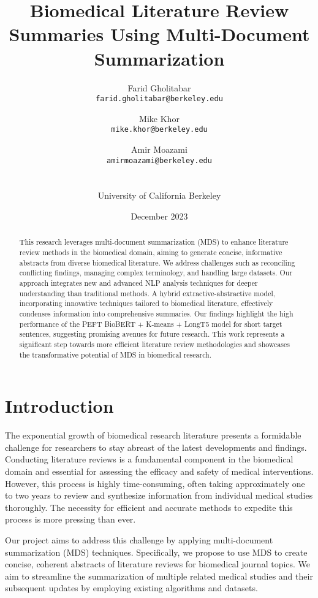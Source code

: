 \documentclass[11pt]{article}
\title{Biomedical Literature Review Summaries Using Multi-Document Summarization}
\author{
  \begin{tabular}{c}
    Farid Gholitabar \\
    {\small\texttt{farid.gholitabar@berkeley.edu}}
  \end{tabular}\and
  \begin{tabular}{c}
    Mike Khor \\
    {\small\texttt{mike.khor@berkeley.edu}}
  \end{tabular}\and
  \begin{tabular}{c}
    Amir Moazami \\
    {\small\texttt{amirmoazami@berkeley.edu}}
  \end{tabular}\\\\
  University of California Berkeley
}
\date{December 2023}
\begin{document}


\maketitle
\begin{abstract}
This research leverages multi-document summarization (MDS) to enhance literature review methods in the biomedical domain, aiming to generate concise, informative abstracts from diverse biomedical literature. We address challenges such as reconciling conflicting findings, managing complex terminology, and handling large datasets. Our approach integrates new and advanced NLP analysis techniques for deeper understanding than traditional methods. A hybrid extractive-abstractive model, incorporating innovative techniques tailored to biomedical literature, effectively condenses information into comprehensive summaries. Our findings highlight the high performance of the PEFT BioBERT + K-means + LongT5 model for short target sentences, suggesting promising avenues for future research. This work represents a significant step towards more efficient literature review methodologies and showcases the transformative potential of MDS in biomedical research.
\end{abstract}

\section{Introduction}

The exponential growth of biomedical research literature presents a formidable challenge for researchers to stay abreast of the latest developments and findings. Conducting literature reviews is a fundamental component in the biomedical domain and essential for assessing the efficacy and safety of medical interventions. However, this process is highly time-consuming, often taking approximately one to two years to review and synthesize information from individual medical studies thoroughly. The necessity for efficient and accurate methods to expedite this process is more pressing than ever.

Our project aims to address this challenge by applying multi-document summarization (MDS) techniques. Specifically, we propose to use MDS to create concise, coherent abstracts of literature reviews for biomedical journal topics. We aim to streamline the summarization of multiple related medical studies and their subsequent updates by employing existing algorithms and datasets.
\end{document}
